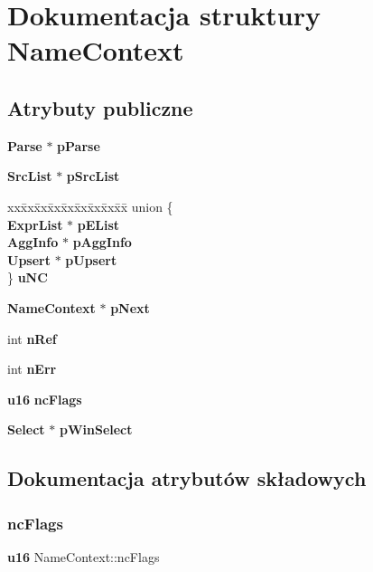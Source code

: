 \section{Dokumentacja struktury Name\+Context}
\label{struct_name_context}
\subsection*{Atrybuty publiczne}
\begin{DoxyCompactItemize}
\item 
\textbf{ Parse} $\ast$ \textbf{ p\+Parse}
\item 
\textbf{ Src\+List} $\ast$ \textbf{ p\+Src\+List}
\item 
\begin{tabbing}
xx\=xx\=xx\=xx\=xx\=xx\=xx\=xx\=xx\=\kill
union \{\\
\>\textbf{ ExprList} $\ast$ \textbf{ pEList}\\
\>\textbf{ AggInfo} $\ast$ \textbf{ pAggInfo}\\
\>\textbf{ Upsert} $\ast$ \textbf{ pUpsert}\\
\} \textbf{ uNC}\\

\end{tabbing}\item 
\textbf{ Name\+Context} $\ast$ \textbf{ p\+Next}
\item 
int \textbf{ n\+Ref}
\item 
int \textbf{ n\+Err}
\item 
\textbf{ u16} \textbf{ nc\+Flags}
\item 
\textbf{ Select} $\ast$ \textbf{ p\+Win\+Select}
\end{DoxyCompactItemize}


\subsection{Dokumentacja atrybutów składowych}
\mbox{\label{struct_name_context_af1721ec037371cabc7385822cbd9629a}} 
\subsubsection{ncFlags}
{\footnotesize\ttfamily \textbf{ u16} Name\+Context\+::nc\+Flags}

\mbox{\label{struct_name_context_aba0b89b42e945c4c96d57a8fe011329c}} 
